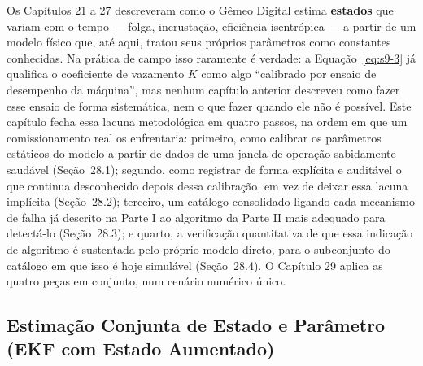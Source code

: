 \documentclass[12pt,a4paper]{article}
\numberwithin{equation}{section}
\numberwithin{table}{section}
\numberwithin{figure}{section}
\begin{document}
Os Capítulos 21 a 27 descreveram como o Gêmeo Digital estima \textbf{estados} que variam com o tempo — folga, incrustação, eficiência isentrópica — a partir de um modelo físico que, até aqui, tratou seus próprios parâmetros como constantes conhecidas. Na prática de campo isso raramente é verdade: a Equação~\eqref{eq:s9-3} já qualifica o coeficiente de vazamento $K$ como algo ``calibrado por ensaio de desempenho da máquina'', mas nenhum capítulo anterior descreveu como fazer esse ensaio de forma sistemática, nem o que fazer quando ele não é possível. Este capítulo fecha essa lacuna metodológica em quatro passos, na ordem em que um comissionamento real os enfrentaria: primeiro, como calibrar os parâmetros estáticos do modelo a partir de dados de uma janela de operação sabidamente saudável (Seção~28.1); segundo, como registrar de forma explícita e auditável o que continua desconhecido depois dessa calibração, em vez de deixar essa lacuna implícita (Seção~28.2); terceiro, um catálogo consolidado ligando cada mecanismo de falha já descrito na Parte I ao algoritmo da Parte II mais adequado para detectá-lo (Seção~28.3); e quarto, a verificação quantitativa de que essa indicação de algoritmo é sustentada pelo próprio modelo direto, para o subconjunto do catálogo em que isso é hoje simulável (Seção~28.4). O Capítulo 29 aplica as quatro peças em conjunto, num cenário numérico único.

\subsection{Estimação Conjunta de Estado e Parâmetro (EKF com Estado Aumentado)}
\end{document}
